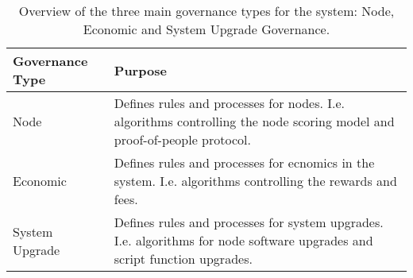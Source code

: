 \begin{table}[H]
 \begin{center}
  \begin{tabular}{|p{3cm}|p{8.5cm}|}
   \hline
   Governance Type & Purpose \\
   \hline
   Node & Defines rules and processes for nodes.\newline
   I.e. algorithms controlling the node scoring model and proof-of-people protocol. \\
   \hline
   Economic & Defines rules and processes for ecnomics in the system. \newline
   I.e. algorithms controlling the rewards and fees. \\
   \hline
   System Upgrade & Defines rules and processes for system upgrades. \newline
   I.e. algorithms for node software upgrades and script function upgrades.\\
   \hline
  \end{tabular}
 \end{center}
 \caption{Overview of the three main governance types for the system: Node, Economic and System Upgrade Governance.}
 \label{tab:governance_types}
\end{table}
